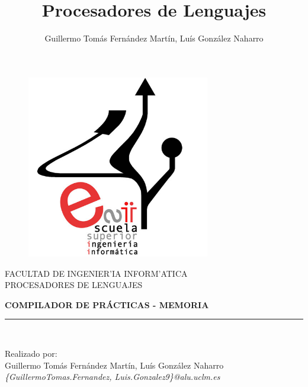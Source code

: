 \documentclass[11pt]{article}
\title{\textbf{Procesadores de Lenguajes}}
\author{Guillermo Tomás Fernández Martín, Luís González Naharro}
\begin{document}
\begin{titlepage}

\begin{center}
\vspace*{-1in}
\begin{figure}[htb]
\begin{center}
\includegraphics[width=8cm]{esiilogo.jpg}
\end{center}
\end{figure}

FACULTAD DE INGENIER'IA INFORM'ATICA\\
\vspace*{0.15in}
PROCESADORES DE LENGUAJES\\
\vspace*{0.15in}
\vspace*{0.2in}
\begin{Large}
\textbf{COMPILADOR DE PRÁCTICAS - MEMORIA} \\
\end{Large}
\vspace*{0.3in}

\rule{80mm}{0.1mm}\\
\vspace*{0.1in}
\vspace*{0.3in}
\begin{large}
Realizado por:\\ Guillermo Tomás Fernández Martín, Luís González Naharro\\
\textit{\{GuillermoTomas.Fernandez, Luis.Gonzalez9\}@alu.uclm.es}

\end{large}
\end{center}

\end{titlepage}



\renewcommand\tablename{Tabla}
\end{document}
